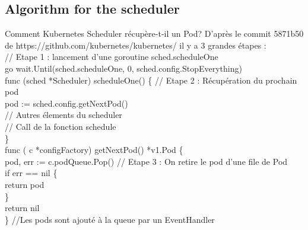 \documentclass{bredelebeamer}
\begin{document}
\subsection{Algorithm for the scheduler}
\begin{frame}{Comment Kubernetes Scheduler récupère-t-il un Pod?}
D'après le commit 5871b50 de https://github.com/kubernetes/kubernetes/ il y a 3 grandes étapes : 
\vspace{10px} \\

\textcolor{Framavert}{// Etape 1 : lancement d'une goroutine sched.scheduleOne\\}
\textcolor{Framarouge}{go} wait.\textcolor{Framableu}{Until}(sched.scheduleOne, \textcolor{Framableu}{0}, sched.config.StopEverything) \pause
\vspace{10px}\\
\textcolor{Framarouge}{func }\textcolor{Framaviolet}{(}\textcolor{Framaorange}{sched }\textcolor{Framaviolet}{*}\textcolor{Framaorange}{Scheduler}\textcolor{Framaviolet}{)} \textcolor{Framaviolet}{scheduleOne}() \{ \textcolor{Framavert}{// Etape 2  : Récupération du prochain pod} \\
\hspace{10px}	pod \textcolor{Framarouge}{:=} sched.config.\textcolor{Framableu}{getNextPod}() \\
\hspace{10px}    \textcolor{Framavert}{// Autres élements du scheduler}\\
\hspace{10px}    \textcolor{Framavert}{// Call de la fonction schedule}\\
\} \\ \pause
\vspace{10px}
\textcolor{Framarouge}{func} \textcolor{Framaviolet}{(}
\textcolor{Framaorange}{c} \textcolor{Framaviolet}{*}\textcolor{Framaorange}{configFactory}\textcolor{Framaviolet}{) getNextPod()} *\textcolor{Framaorange}{v1.Pod} \{  \\
\hspace{10px}pod, err \textcolor{Framarouge}{:=} c.podQueue.\textcolor{Framableu}{Pop}() \textcolor{Framavert}{// Etape 3 : On retire le pod d'une file de Pod}\\
\hspace{10px}\textcolor{Framaorange}{if} err == \textcolor{Framableu}{nil} \{ \\
\hspace{10px}\hspace{10px}	return pod \\
\hspace{10px}	\} \\
\hspace{10px}	return  \textcolor{Framableu}{nil}\\
\} \pause
\textcolor{Framavert}{//Les pods sont ajouté à la queue par un EventHandler}

\end{frame}
\end{document}

